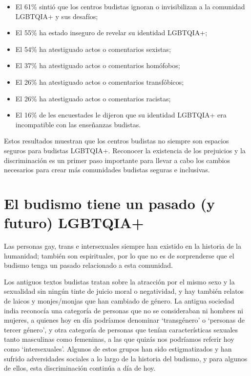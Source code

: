 \documentclass[12pt,openany]{book}
\begin{document}
\begin{itemize}
\setlength\itemsep{-0.3em}
  \item El 61\% sintió que los centros budistas ignoran o invisibilizan a la comunidad LGBTQIA+ y sus desafíos;
  \item El 55\% ha estado inseguro de revelar su identidad LGBTQIA+;
  \item El 54\% ha atestiguado actos o comentarios sexistas;
  \item El 37\% ha atestiguado actos o comentarios homófobos;
  \item El 26\% ha atestiguado actos o comentarios transfóbicos;
  \item El 26\% ha atestiguado actos o comentarios racistas;
  \item El 16\% de les encuestades le dijeron que su identidad LGBTQIA+ era incompatible con las enseñanzas budistas.
\end{itemize}

Estos resultados muestran que los centros budistas no siempre son espacios seguros para budistas LGBTQIA+. Reconocer la existencia de los prejuicios y la discriminación es un primer paso importante para llevar a cabo los cambios necesarios para crear más comunidades budistas seguras e inclusivas.

\section*{El budismo tiene un pasado (y futuro) LGBTQIA+}

Las personas gay, trans e intersexuales siempre han existido en la historia de la humanidad; también son espirituales, por lo que no es de sorprenderse que el budismo tenga un pasado relacionado a esta comunidad.

Los antiguos textos budistas tratan sobre la atracción por el mismo sexo y la sexualidad sin ningún tinte de juicio moral o negatividad, y hay también relatos de laicos y monjes/monjas que han cambiado de género. La antigua sociedad india reconocía una categoría de personas que no se consideraban ni hombres ni mujeres, a quienes hoy en día podríamos denominar `transgénero' o `personas de tercer género', y otra categoría de personas que tenían características sexuales tanto masculinas como femeninas, a las que quizás nos podríamos referir hoy como `intersexuales'. Algunos de estos grupos han sido estigmatizados y han sufrido adversidades sociales a lo largo de la historia del budismo, y para algunos de ellos, esta discriminación continúa a día de hoy.
\end{document}
